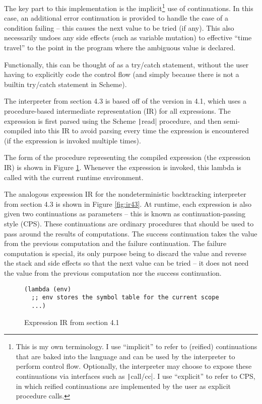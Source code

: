 \documentclass[]{article}
\begin{document}
The key part to this implementation is the implicit\footnote{This is my own terminology. I use ``implicit'' to refer to (reified) continuations that are baked into the language and can be used by the interpreter to perform control flow. Optionally, the interpreter may choose to expose these continuations via interfaces such as \texttt|call/cc|. I use ``explicit'' to refer to CPS, in which reified continuations are implemented by the user as explicit procedure calls.} use of continuations. In this case, an additional error continuation is provided to handle the case of a condition failing -- this causes the next value to be tried (if any). This also necessarily undoes any side effects (such as variable mutation) to effective ``time travel'' to the point in the program where the ambiguous value is declared.

Functionally, this can be thought of as a try/catch statement, without the user having to explicitly code the control flow (and simply because there is not a builtin try/catch statement in Scheme).

The interpreter from section 4.3 is based off of the version in 4.1, which uses a procedure-based intermediate representation (IR) for all expressions. The expression is first parsed using the Scheme \texttt|read| procedure, and then semi-compiled into this IR to avoid parsing every time the expression is encountered (if the expression is invoked multiple times).

The form of the procedure representing the compiled expression (the expression IR) is shown in Figure \ref{fig:ir41}. Whenever the expression is invoked, this lambda is called with the current runtime environment.

The analogous expression IR for the nondeterministic backtracking interpreter from section 4.3 is shown in Figure \ref{fig:ir43}. At runtime, each expression is also given two continuations as parameters -- this is known as continuation-passing style (CPS). These continuations are ordinary procedures that should be used to pass around the results of computations. The success continuation takes the value from the previous computation and the failure continuation. The failure computation is special, its only purpose being to discard the value and reverse the stack and side effects so that the next value can be tried -- it does not need the value from the previous computation nor the success continuation.

\begin{figure}[]
  \centering
\begin{verbatim}
(lambda (env)
  ;; env stores the symbol table for the current scope
  ...)
\end{verbatim}
  \caption{Expression IR from section 4.1}
  \label{fig:ir41}
\end{figure}
\end{document}
